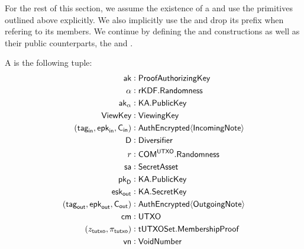 For the rest of this section, we assume the existence of a \TransferConfiguration{} and use the primitives outlined above explicitly. We also implicitly use the \KeySchedule{} and drop its prefix when refering to its members. We continue by defining the \Sender{} and \Receiver{} constructions as well as their public counterparts, the \SenderPost{} and \ReceiverPost{}.

\begin{definition}
    A \Sender{} is the following tuple:
    \begin{align*}
        {\textsf{ak}}                       &: {\textsf{ProofAuthorizingKey}} \\
        \alpha                    &: {\textsf{rKDF}}.{\textsf{Randomness}} \\
        {\textsf{ak}}_\alpha                &: {\textsf{KA}}.{\textsf{PublicKey}} \\
        {\textsf{ViewKey}}                  &: {\textsf{ViewingKey}} \\
        ({{\textsf{tag}}_\textsf{in}}, {{\textsf{epk}}_\textsf{in}}, {\textsf{C}_\textsf{in}})    &: {\textsf{AuthEncrypted}}\langle{{\textsf{IncomingNote}}}\rangle \\
        \textsf{D}                &: {\textsf{Diversifier}} \\
        r                         &: {\textsf{COM}}^{\textsf{UTXO}}.{\textsf{Randomness}} \\
        {\textsf{sa}}                       &: {\textsf{SecretAsset}} \\
        {{\textsf{pk}}_\textsf{D}}                      &: {\textsf{KA}}.{\textsf{PublicKey}} \\
        {{\textsf{esk}}_{\textsf{out}}}                   &: {\textsf{KA}}.{\textsf{SecretKey}} \\
        ({{\textsf{tag}}_{\textsf{out}}}, {{\textsf{epk}}_{\textsf{out}}}, {\textsf{C}_\textsf{out}}) &: {\textsf{AuthEncrypted}}\langle{{\textsf{OutgoingNote}}}\rangle \\
        {\textsf{cm}}                       &: {\textsf{UTXO}} \\
        (z_{\textsf{tutxo}}, \pi_{\textsf{tutxo}})          &: {\textsf{tUTXOSet}}.{\textsf{MembershipProof}} \\
        {\textsf{vn}}                       &: {\textsf{VoidNumber}}
    \end{align*}


\end{definition}
